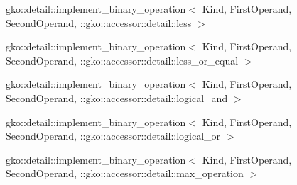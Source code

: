 \begin{DoxyCompactList}
\begin{DoxyCompactList}
\item {}
\end{DoxyCompactList}
\item gko\+:\+:detail\+:\+:implement\+\_\+binary\+\_\+operation$<$ Kind, First\+Operand, Second\+Operand, \+:\+:gko\+:\+:accessor\+:\+:detail\+:\+:less $>$\begin{DoxyCompactList}
\item {}
\end{DoxyCompactList}
\item gko\+:\+:detail\+:\+:implement\+\_\+binary\+\_\+operation$<$ Kind, First\+Operand, Second\+Operand, \+:\+:gko\+:\+:accessor\+:\+:detail\+:\+:less\+\_\+or\+\_\+equal $>$\begin{DoxyCompactList}
\item {}
\end{DoxyCompactList}
\item gko\+:\+:detail\+:\+:implement\+\_\+binary\+\_\+operation$<$ Kind, First\+Operand, Second\+Operand, \+:\+:gko\+:\+:accessor\+:\+:detail\+:\+:logical\+\_\+and $>$\begin{DoxyCompactList}
\item {}
\end{DoxyCompactList}
\item gko\+:\+:detail\+:\+:implement\+\_\+binary\+\_\+operation$<$ Kind, First\+Operand, Second\+Operand, \+:\+:gko\+:\+:accessor\+:\+:detail\+:\+:logical\+\_\+or $>$\begin{DoxyCompactList}
\item {}
\end{DoxyCompactList}
\item gko\+:\+:detail\+:\+:implement\+\_\+binary\+\_\+operation$<$ Kind, First\+Operand, Second\+Operand, \+:\+:gko\+:\+:accessor\+:\+:detail\+:\+:max\+\_\+operation $>$\begin{DoxyCompactList}

\end{DoxyCompactList}
\end{DoxyCompactList}
